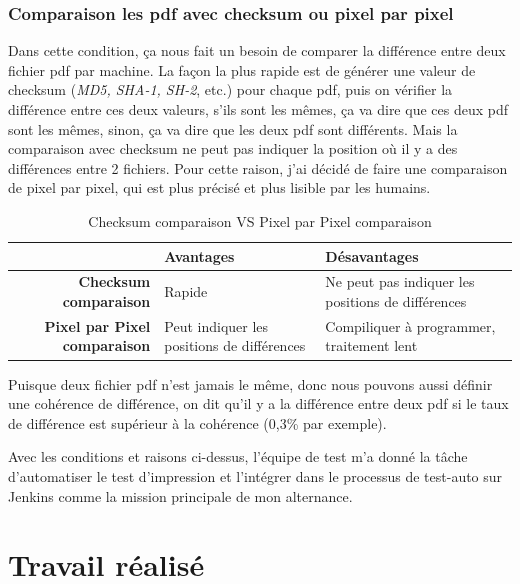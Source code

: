     \subsubsection{Comparaison les pdf avec checksum ou pixel par pixel}
    \par Dans cette condition, ça nous fait un besoin de comparer la différence entre deux fichier pdf par machine. La façon la plus rapide est de générer une valeur de checksum (\textit{MD5, SHA-1, SH-2}, etc.) pour chaque pdf, puis on vérifier la différence entre ces deux valeurs, s'ils sont les mêmes, ça va dire que ces deux pdf sont les mêmes, sinon, ça va dire que les deux pdf sont différents. Mais la comparaison avec checksum ne peut pas indiquer la position où il y a des différences entre 2 fichiers. Pour cette raison, j'ai décidé de faire une comparaison de pixel par pixel, qui est plus précisé et plus lisible par les humains. 
    
    \begin{table}[H]
        \centering
        \begin{tabular}{|r|m{4cm}|m{4cm}|}
            \hline
            &   \Large{\textbf{Avantages}} & \Large{\textbf{Désavantages}}\\
            \hline
            \textbf{Checksum comparaison} & Rapide & Ne peut pas indiquer les positions de différences  \\
            \hline
             \textbf{Pixel par Pixel comparaison} & Peut indiquer les positions de différences  & Compiliquer à programmer, traitement lent \\
             \hline
        \end{tabular}
        \caption{Checksum comparaison VS Pixel par Pixel comparaison}
        \label{tab:pixel_vs_checksum_label}
    \end{table}
    \par Puisque deux fichier pdf n'est jamais le même, donc nous pouvons aussi définir une cohérence de différence, on dit qu'il y a la différence entre deux pdf si le taux de différence est supérieur à la cohérence (0,3\% par exemple).
    
    \par Avec les conditions et raisons ci-dessus, l'équipe de test m'a donné la tâche d'automatiser le test d'impression et l'intégrer dans le processus de test-auto sur Jenkins comme la mission principale de mon alternance.

\newpage
\section{Travail réalisé}
